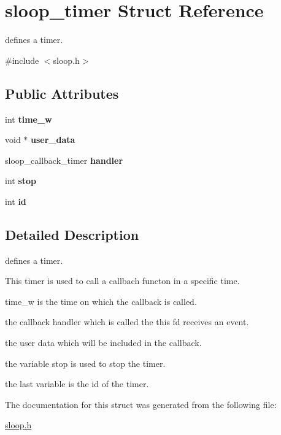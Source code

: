 \hypertarget{structsloop__timer}{\section{sloop\-\_\-timer \-Struct \-Reference}
\label{structsloop__timer}
}


defines a timer.  




{\ttfamily \#include $<$sloop.\-h$>$}

\subsection*{\-Public \-Attributes}
\begin{DoxyCompactItemize}
\item 
\hypertarget{structsloop__timer_a84d61072e846ed5798b6bdcd409f9f54}{int {\bfseries time\-\_\-w}}\label{structsloop__timer_a84d61072e846ed5798b6bdcd409f9f54}

\item 
\hypertarget{structsloop__timer_a04bbac44f72ee1dd224f545032140a40}{void $\ast$ {\bfseries user\-\_\-data}}\label{structsloop__timer_a04bbac44f72ee1dd224f545032140a40}

\item 
\hypertarget{structsloop__timer_a3beaf491849af0b9c2ea0f4e3a5d5ded}{sloop\-\_\-callback\-\_\-timer {\bfseries handler}}\label{structsloop__timer_a3beaf491849af0b9c2ea0f4e3a5d5ded}

\item 
\hypertarget{structsloop__timer_a0c8de0375a8fe05c4510149d9aeff8e2}{int {\bfseries stop}}\label{structsloop__timer_a0c8de0375a8fe05c4510149d9aeff8e2}

\item 
\hypertarget{structsloop__timer_ab9929ff8a87996a5aaa1c399c8e62c49}{int {\bfseries id}}\label{structsloop__timer_ab9929ff8a87996a5aaa1c399c8e62c49}

\end{DoxyCompactItemize}


\subsection{\-Detailed \-Description}
defines a timer. 

\-This timer is used to call a callbach functon in a specific time.
\begin{DoxyItemize}
\item time\-\_\-w is the time on which the callback is called.
\item the callback handler which is called the this fd receives an event.
\item the user data which will be included in the callback.
\item the variable stop is used to stop the timer.
\item the last variable is the id of the timer. 
\end{DoxyItemize}

\-The documentation for this struct was generated from the following file\-:\begin{DoxyCompactItemize}
\item 
\hyperlink{sloop_8h}{sloop.\-h}\end{DoxyCompactItemize}
